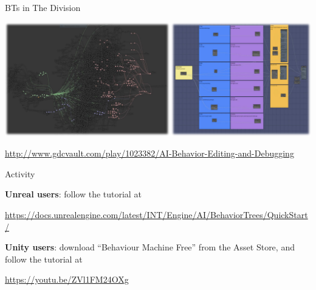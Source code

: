 \begin{frame}{BTs in The Division}
	\begin{center}
		\includegraphics[width=\textwidth]{the_division}
		
		\url{http://www.gdcvault.com/play/1023382/AI-Behavior-Editing-and-Debugging}
	\end{center}
\end{frame}

\begin{frame}{Activity}
	\begin{center}
		\textbf{Unreal users}: follow the tutorial at
		
		\url{https://docs.unrealengine.com/latest/INT/Engine/AI/BehaviorTrees/QuickStart/}
		
		\vspace{2ex}
		
		\textbf{Unity users}: download ``Behaviour Machine Free'' from the Asset Store, and follow the tutorial at
		
		\url{https://youtu.be/ZVl1FM24OXg}
	\end{center}
\end{frame}
